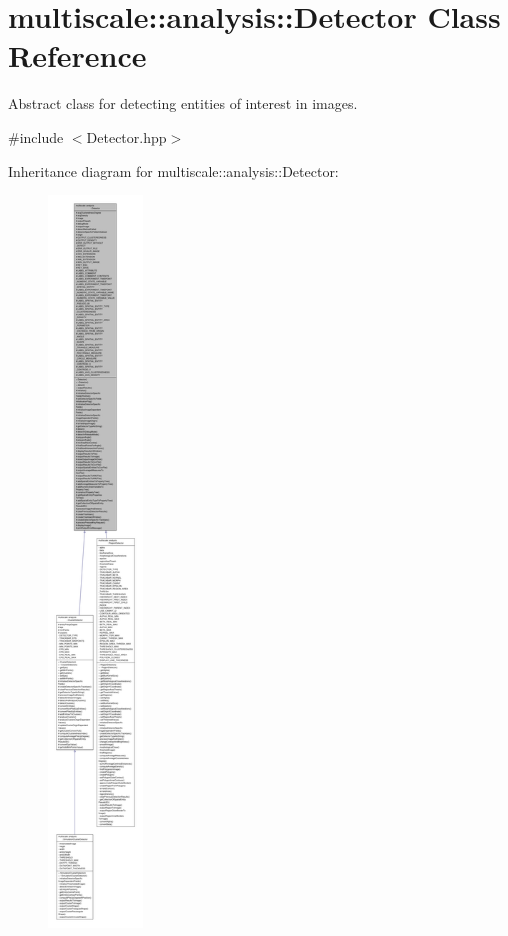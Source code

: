 \hypertarget{classmultiscale_1_1analysis_1_1Detector}{\section{multiscale\-:\-:analysis\-:\-:Detector Class Reference}
\label{classmultiscale_1_1analysis_1_1Detector}
}


Abstract class for detecting entities of interest in images.  




{\ttfamily \#include $<$Detector.\-hpp$>$}



Inheritance diagram for multiscale\-:\-:analysis\-:\-:Detector\-:\nopagebreak
\begin{figure}[H]
\begin{center}
\leavevmode
\includegraphics[height=550pt]{classmultiscale_1_1analysis_1_1Detector__inherit__graph}
\end{center}
\end{figure}


